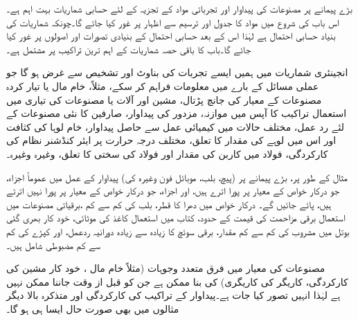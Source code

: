 بڑے پیمانے پر مصنوعات کی پیداوار اور تجرباتی مواد کے تجزیہ  کے لئے حسابی شماریات بہت اہم ہے۔ اس باب کی شروع میں مواد کا جدول اور ترسیم سے اظہار پر غور کیا جائے گا۔چونکہ شماریات کی بنیاد حسابی احتمال ہے لہٰذا  اس کے بعد حسابی احتمال کے بنیادی تصورات اور اصولوں پر غور کیا جائے گا۔باب کا باقی حصہ شماریات کے اہم ترین تراکیب پر مشتمل ہے۔

انجینئری شماریات میں ہمیں ایسے تجربات کی بناوٹ اور تشخیص سے غرض ہو گا جو عملی مسائل کے بارے میں معلومات فراہم کر سکے، مثلاً، خام مال  یا تیار کردہ مصنوعات کے معیار کی جانچ پڑتال، مشین اور آلات یا مصنوعات کی تیاری میں استعمال تراکیب کا آپس میں موازنہ، مزدور کی پیداوار، صارفین کا نئی مصنوعات کے لئے رد عمل،  مختلف حالات میں کیمیائی عمل سے حاصل پیداوار، خام لوہا کی کثافت اور اس میں لوہے کی مقدار کا تعلق،  مختلف درجہ حرارت پر ایئر کنڈشنر  نظام کی کارکردگی، فولاد میں کاربن کی مقدار اور فولاد کی  سختی کا تعلق، وغیرہ وغیرہ۔

مثال کے طور پر، بڑے پیمانے پر (پیچ، بلب، موبائل فون وغیرہ کی) پیداوار کے عمل میں عموماً   اجزاء، جو درکار خواص کے معیار پر پورا اترے ہیں،  اور   اجزاء، جو درکار خواص کے معیار پر پورا نہیں اترتے ہیں، پائے جائیں گے۔  درکار خواص میں دھرا کا قطر، بلب کی کم سے کم ،برقیاتی مصنوعات میں استعمال برقی مزاحمت کی قیمت کے حدود، کتاب میں استعمال کاغذ کی موٹائی، خود کار بھری گئی بوتل میں مشروب کی کم سے کم مقدار، برقی سوئچ کا زیادہ سے زیادہ دورانیہ ردعمل، اور کپڑے کی کم سے کم  مضبوطی شامل ہیں۔

مصنوعات کی معیار میں فرق متعدد وجوہات (مثلاً خام مال ، خود کار مشین کی کارکردگی، کاریگر  کی کاریگری) کی بنا ممکن ہے جن کو قبل از وقت جاننا ممکن نہیں ہے لہٰذا انہیں  تصور کیا جات ہے۔پیداوار کے تراکیب کی کارکردگی اور متذکرہ بالا دیگر مثالوں میں بھی صورت حال ایسا ہی ہو گا۔ 

